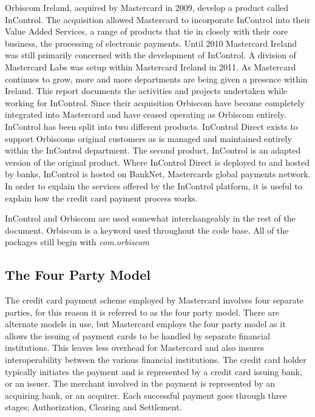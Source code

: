 \documentclass[a4paper, 11pt, titlepage]{article}
\begin{document}
Orbiscom Ireland, acquired by Mastercard in 2009, develop a product called InControl. The acquisition allowed Mastercard to incorporate InControl into their Value Added Services, a range of products that tie in closely with their core business, the processing of electronic payments. Until 2010 Mastercard Ireland was still primarily concerned with the development of InControl. A division of Mastercard Labs was setup within Mastercard Ireland in 2011. As Mastercard continues to grow, more and more departments are being given a presence within Ireland. This report documents the activities and projects undertaken while working for InControl. Since their acquisition Orbiscom have become completely integrated into Mastercard and have ceased operating as Orbiscom entirely. InControl has been split into two different products. InControl Direct exists to support Orbiscoms original customers as is managed and maintained entirely within the InControl department. The second product, InControl is an adapted version of the original product. Where InControl Direct is deployed to and hosted by banks, InControl is hosted on BankNet, Mastercards global payments network. In order to explain the services offered by the InControl platform, it is useful to explain how the credit card payment process works.

InControl and Orbiscom are used somewhat interchangeably in the rest of the document. Orbiscom is a keyword used throughout the code base. All of the packages still begin with \textit{com.orbiscom}

\subsection{The Four Party Model}
The credit card payment scheme employed by Mastercard involves four separate parties, for this reason it is referred to as the four party model. There are alternate models in use, but Mastercard employs the four party model as it allows the issuing of payment cards to be handled by separate financial institutions. This leaves less overhead for Mastercard and also insures interoperability between the various financial institutions. The credit card holder typically initiates the payment and is represented by a credit card issuing bank, or an issuer. The merchant involved in the payment is represented by an acquiring bank, or an acquirer. Each successful payment goes through three stages; Authorization, Clearing and Settlement.
\end{document}

